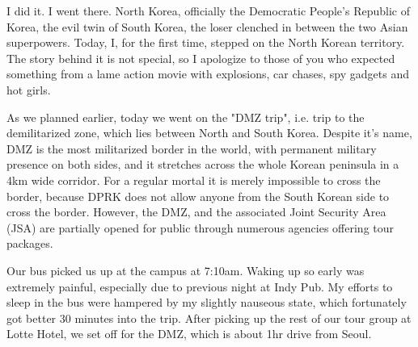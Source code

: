 \begin{post}
	\begin{content}
I did it. I went there. North Korea, officially the Democratic People's Republic of Korea, the evil twin of South Korea, the loser clenched in between the two Asian superpowers. Today, I, for the first time, stepped on the North Korean territory. The story behind it is not special, so I apologize to those of you who expected something from a lame action movie with explosions, car chases, spy gadgets and hot girls.

\begin{figure}
\vspace{-12pt}
\centering{}
\end{figure}As we planned earlier, today we went on the "DMZ trip", i.e. trip to the demilitarized zone, which lies between North and South Korea. Despite it's name, DMZ is the most militarized border in the world, with permanent military presence on both sides, and it stretches across the whole Korean peninsula in a 4km wide corridor. For a regular mortal it is merely impossible to cross the border, because DPRK does not allow anyone from the South Korean side to cross the border. However, the DMZ, and the associated Joint Security Area (JSA) are partially opened for public through numerous agencies offering tour packages.

Our bus picked us up at the campus at 7:10am. Waking up so early was extremely painful, especially due to previous night at Indy Pub. My efforts to sleep in the bus were hampered by my slightly nauseous state, which fortunately got better 30 minutes into the trip. After picking up the rest of our tour group at Lotte Hotel, we set off for the DMZ, which is about 1hr drive from Seoul.


\end{content}
\end{post}
